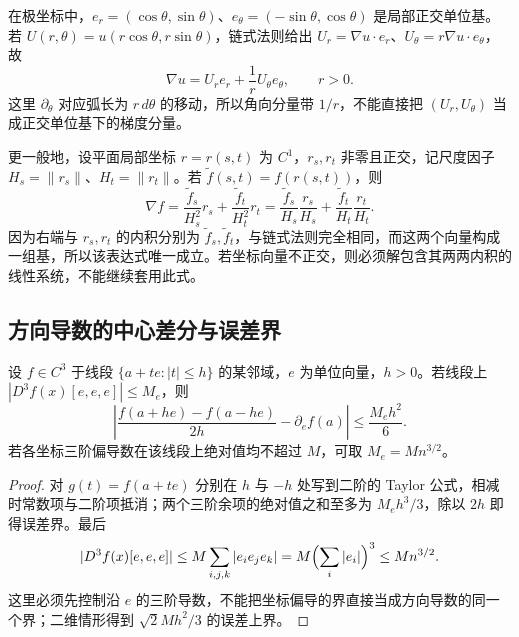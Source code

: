 在极坐标中，$e_r=(\cos\theta,\sin\theta)$、$e_\theta=(-\sin\theta,\cos\theta)$ 是局部正交单位基。若 $U(r,\theta)=u(r\cos\theta,r\sin\theta)$，链式法则给出 $U_r=\nabla u\cdot e_r$、$U_\theta=r\nabla u\cdot e_\theta$，故
\[
\nabla u=U_r e_r+\frac1rU_\theta e_\theta,\qquad r>0.
\]
这里 $\partial_\theta$ 对应弧长为 $r\,d\theta$ 的移动，所以角向分量带 $1/r$，不能直接把 $(U_r,U_\theta)$ 当成正交单位基下的梯度分量。

更一般地，设平面局部坐标 $r=r(s,t)$ 为 $C^1$，$r_s,r_t$ 非零且正交，记尺度因子 $H_s=\|r_s\|$、$H_t=\|r_t\|$。若 $\widetilde f(s,t)=f(r(s,t))$，则
\[
\nabla f=\frac{\widetilde f_s}{H_s^2}r_s+\frac{\widetilde f_t}{H_t^2}r_t
=\frac{\widetilde f_s}{H_s}\frac{r_s}{H_s}+\frac{\widetilde f_t}{H_t}\frac{r_t}{H_t}.
\]
因为右端与 $r_s,r_t$ 的内积分别为 $\widetilde f_s,\widetilde f_t$，与链式法则完全相同，而这两个向量构成一组基，所以该表达式唯一成立。若坐标向量不正交，则必须解包含其两两内积的线性系统，不能继续套用此式。

\subsection{方向导数的中心差分与误差界}

\begin{proposition}
设 $f\in C^3$ 于线段 $\{a+te:|t|\le h\}$ 的某邻域，$e$ 为单位向量，$h>0$。若线段上 $|D^3f(x)[e,e,e]|\le M_e$，则
\[
\left|\frac{f(a+he)-f(a-he)}{2h}-\partial_ef(a)\right|\le\frac{M_eh^2}{6}.
\]
若各坐标三阶偏导数在该线段上绝对值均不超过 $M$，可取 $M_e=Mn^{3/2}$。
\end{proposition}
\begin{proof}
对 $g(t)=f(a+te)$ 分别在 $h$ 与 $-h$ 处写到二阶的 Taylor 公式，相减时常数项与二阶项抵消；两个三阶余项的绝对值之和至多为 $M_eh^3/3$，除以 $2h$ 即得误差界。最后
\[
|D^3f(x)[e,e,e]|\le M\sum_{i,j,k}|e_ie_je_k|=M\Bigl(\sum_i|e_i|\Bigr)^3\le Mn^{3/2}.
\]
这里必须先控制沿 $e$ 的三阶导数，不能把坐标偏导的界直接当成方向导数的同一个界；二维情形得到 $\sqrt2 Mh^2/3$ 的误差上界。
\end{proof}





